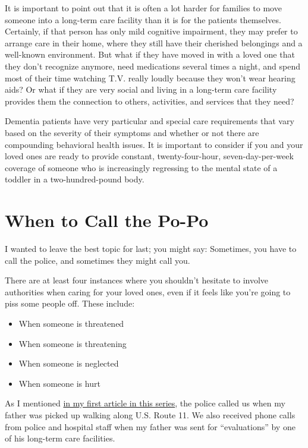 \documentclass{article}
\begin{document}
It is important to point out that it is often a lot harder for families to move someone into a long-term care facility than it is for the patients themselves. Certainly, if that person has only mild cognitive impairment, they may prefer to arrange care in their home, where they still have their cherished belongings and a well-known environment. But what if they have moved in with a loved one that they don't recognize anymore, need medications several times a night, and spend most of their time watching T.V. really loudly because they won't wear hearing aids? Or what if they are very social and living in a long-term care facility provides them the connection to others, activities, and services that they need?

Dementia patients have very particular and special care requirements that vary based on the severity of their symptoms and whether or not there are compounding behavioral health issues. It is important to consider if you and your loved ones are ready to provide constant, twenty-four-hour, seven-day-per-week coverage of someone who is increasingly regressing to the mental state of a toddler in a two-hundred-pound body.

\section*{When to Call the Po-Po}

I wanted to leave the best topic for last; you might say: Sometimes, you have to call the police, and sometimes they might call you.

There are at least four instances where you shouldn't hesitate to involve authorities when caring for your loved ones, even if it feels like you're going to piss some people off. These include:
\begin{itemize}
    \item When someone is threatened
    \item When someone is threatening
    \item When someone is neglected
    \item When someone is hurt
\end{itemize}

As I mentioned \href{https://jayjaybillings.com/2023/07/06/outliving-your-mind-part-1-the-secret/}{in my first article in this series}, the police called us when my father was picked up walking along U.S. Route 11. We also received phone calls from police and hospital staff when my father was sent for ``evaluations'' by one of his long-term care facilities.
\end{document}
